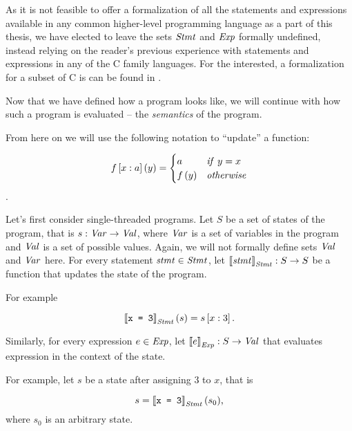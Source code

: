 \documentclass[..thesis.tex]{subfiles}
\begin{document}
As it is not feasible to offer a formalization of all the statements and expressions available in any common higher-level programming language
as a part of this thesis, we have elected to leave the sets $\mathit{Stmt}$ and $\mathit{Exp}$ formally undefined, instead relying on the reader's previous experience
with statements and expressions in any of the C family languages. For the interested, a formalization for a subset of C is can be found in \cite[17]{vojdanivesal_static_2010}.


Now that we have defined how a program looks like, we will continue with how such a program is evaluated -- the \textit{semantics} of the program.

From here on we will use the following notation to ``update'' a function:

\begin{equation*}
f \left[ x : a \right] \left( y \right) = 
  \begin{cases}
  a & \mathit{if} ~ y = x \\
  f \left(  y \right) & \mathit{otherwise} \\ 
  \end{cases}
\end{equation*}.

Let's first consider single-threaded programs. Let $S$ be a set of states of the program, that is $s : \mathit{Var} \to \mathit{Val}$, where $\mathit{Var}$ is a set of
variables in the program and $\mathit{Val}$ is a set of possible values. Again, we will not formally define sets $\mathit{Val}$ and $\mathit{Var}$ here.
For every statement $\mathit{stmt} \in \mathit{Stmt}$, let $ \left\llbracket \mathit{stmt} \right\rrbracket_{\mathit{Stmt}} : S \to S$ be a function that updates the state of the program. 

For example

\begin{equation*}
 \left\llbracket \text{\texttt{x = 3}} \right\rrbracket_{\mathit{Stmt}} (s) = s \left[ x : 3 \right] \text{.}
\end{equation*}

Similarly, for every expression $e \in \mathit{Exp}$, let $\left\llbracket e \right\rrbracket_{\mathit{Exp}} : S \to \mathit{Val}$ that evaluates expression in the context of the state. 

For example, let $s$ be a state after assigning $3$ to $x$, that is

\begin{equation*}
s = \left\llbracket \text{\texttt{x = 3}} \right\rrbracket_{\mathit{Stmt}} (s_0) \text{,}
\end{equation*}
where $s_0$ is an arbitrary state. 
\end{document}
